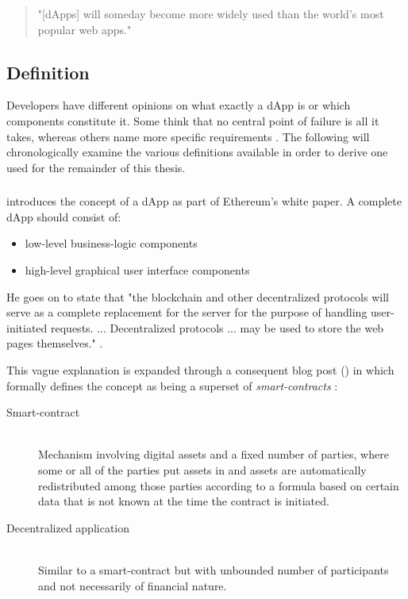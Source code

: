 \begin{quote}
  "[\acp{dApp}] will someday become more widely used than the world's most popular web apps." \cite[p.~5]{Raval.2016}
\end{quote}

\subsection{Definition}
Developers have different opinions on what exactly a \ac{dApp} is or which components constitute it. Some think that no central point of failure is all it takes, whereas others name more specific requirements \cite[p.~9]{Raval.2016}. The following will chronologically examine the various definitions available in order to derive one used for the remainder of this thesis. 

\subsubsection{\citeyear{EthereumWhitepaper}}
\citeauthor{EthereumWhitepaper} introduces the concept of a \ac{dApp} as part of Ethereum's white paper. A complete \ac{dApp} should consist of:

\begin{itemize}
  \item low-level business-logic components
  \item high-level graphical user interface components
\end{itemize}

He goes on to state that "the blockchain and other decentralized protocols will serve as a complete replacement for the server for the purpose of handling user-initiated requests. ... Decentralized protocols ... may be used to store the web pages themselves." \cite[p.~34]{EthereumWhitepaper}. 

This vague explanation is expanded through a consequent blog post (\citeyear{Buterin2014}) in which \citeauthor{Buterin2014} formally defines the concept as being a superset of \textit{smart-contracts} \cite{Buterin2014}:

\begin{description}
	\item[Smart-contract]
	\hfill \\
	Mechanism involving digital assets and a fixed number of parties, where some or all of the parties put assets in and assets are automatically redistributed among those parties according to a formula based on certain data that is not known at the time the contract is initiated.
	\item[Decentralized application]
	\hfill \\
	Similar to a smart-contract but with unbounded number of participants and not necessarily of financial nature.
\end{description}

